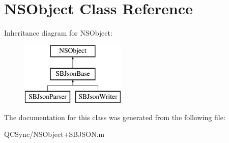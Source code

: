 \hypertarget{class_n_s_object}{
\section{NSObject Class Reference}
\label{class_n_s_object}
}
Inheritance diagram for NSObject:\begin{figure}[H]
\begin{center}
\leavevmode
\includegraphics[height=3.000000cm]{class_n_s_object}
\end{center}
\end{figure}


The documentation for this class was generated from the following file:\begin{DoxyCompactItemize}
\item 
QCSync/NSObject+SBJSON.m\end{DoxyCompactItemize}

